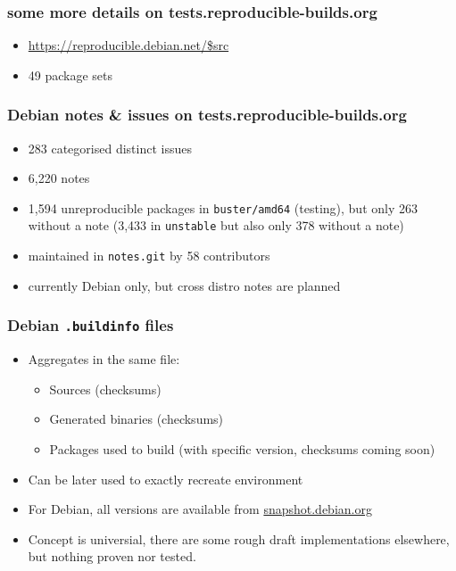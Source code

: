 \documentclass[14pt,aspectratio=169]{beamer}
\begin{document}
\begin{frame}
 \frametitle{some more details on tests.reproducible-builds.org}

 \begin{itemize}
  \item \url{https://reproducible.debian.net/$src}
  \item<2> 49 package sets 
 \end{itemize}
\end{frame}

\begin{frame}
	\frametitle{Debian notes \& issues on tests.reproducible-builds.org}

 \begin{itemize}
  \item 283 categorised distinct issues
  \item 6,220 notes
  \item 1,594 unreproducible packages in \texttt{buster/amd64} (testing), but only
  263 without a note (3,433 in \texttt{unstable} but also only 378 without a
  note)
  \item maintained in \texttt{notes.git} by 58 contributors
  \item currently Debian only, but cross distro notes are planned
 \end{itemize}
\end{frame}


\begin{frame}
 \frametitle{Debian \texttt{.buildinfo} files}

 \begin{itemize}
  \item Aggregates in the same file:
   \begin{itemize}
    \item Sources (checksums)
    \item Generated binaries (checksums)
    \item Packages used to build (with specific version, checksums coming soon)
   \end{itemize}
  \item Can be later used to exactly recreate environment
  \item For Debian, all versions are available from \url{snapshot.debian.org}
  \item<2>Concept is universial, there are some rough draft implementations elsewhere, but nothing proven nor tested.
 \end{itemize}
\end{frame}
\end{document}
